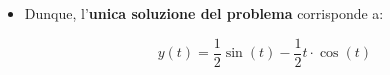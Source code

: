 \documentclass[a4paper, 12pt]{report}
\begin{document}
\begin{itemize}
\begin{itemize}
            $$ 
            \left \{ \begin{array}{l}
                y(t_0) = C \cdot \cos(t_0) + D \cdot \sin(t_0) -\frac{1}{2}\cos(t_0)\\
                y'(t_0) = -C \cdot \sin(t_0) + D \cdot \cos(t_0) -\frac{1}{2} \cdot \cos(t_0) + \frac{1}{2}t_0 \cdot \sin(t_0)
            \end{array}\right .
            $$ 
            
            $$ 
            \left \{ \begin{array}{l}
                0 = C \cdot \cos(0) + D \cdot \sin(0) -\frac{1}{2}\cos(0)\\
                0 = -C \cdot \sin(0) + D \cdot \cos(0) -\frac{1}{2} \cdot \cos(0) + \frac{1}{2} \cdot 0 \cdot \sin(t)
            \end{array}\right .
            $$ 
            
            $$ 
            \left \{ \begin{array}{l}
                0 = C\\
                0 = D - \frac{1}{2}
            \end{array}\right .
            \quad \Longrightarrow \quad 
            \left \{ \begin{array}{l}
                C = 0 \\
                D = \frac{1}{2}
            \end{array}\right .
            $$ 
            
            \item Dunque, l'\textbf{unica soluzione del problema} corrisponde a:
            
            \[ y(t) = \frac{1}{2} \sin(t)-\frac{1}{2}t \cdot \cos(t) \]
        \end{itemize}
        
    \end{itemize}
\end{document}
